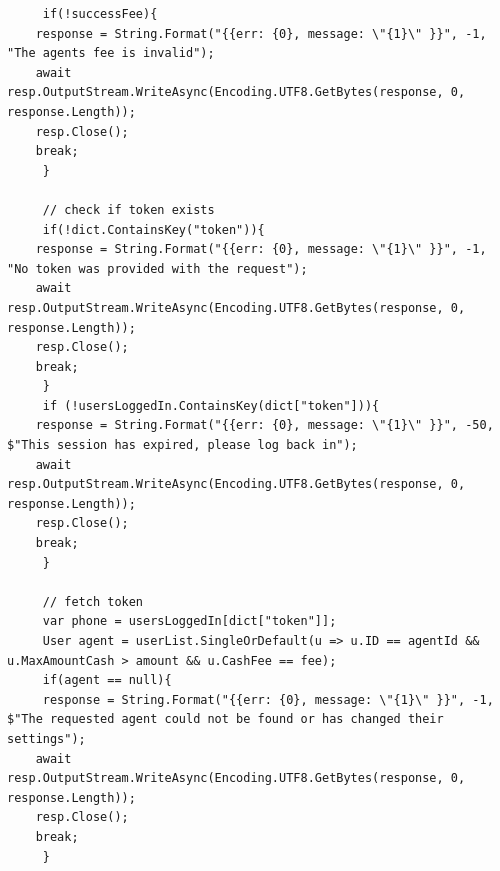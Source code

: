 \documentclass[11pt, a4paper]{article}
\begin{document}
\begin{appendices}
\begin{lstlisting}
     if(!successFee){
    response = String.Format("{{err: {0}, message: \"{1}\" }}", -1, "The agents fee is invalid");
    await resp.OutputStream.WriteAsync(Encoding.UTF8.GetBytes(response, 0, response.Length));
    resp.Close();
    break;
     }

     // check if token exists
     if(!dict.ContainsKey("token")){
    response = String.Format("{{err: {0}, message: \"{1}\" }}", -1, "No token was provided with the request");
    await resp.OutputStream.WriteAsync(Encoding.UTF8.GetBytes(response, 0, response.Length));
    resp.Close();
    break;
     }
     if (!usersLoggedIn.ContainsKey(dict["token"])){
    response = String.Format("{{err: {0}, message: \"{1}\" }}", -50, $"This session has expired, please log back in");
    await resp.OutputStream.WriteAsync(Encoding.UTF8.GetBytes(response, 0, response.Length));
    resp.Close();
    break;
     }

     // fetch token
     var phone = usersLoggedIn[dict["token"]];
     User agent = userList.SingleOrDefault(u => u.ID == agentId && u.MaxAmountCash > amount && u.CashFee == fee);
     if(agent == null){
     response = String.Format("{{err: {0}, message: \"{1}\" }}", -1, $"The requested agent could not be found or has changed their settings");
    await resp.OutputStream.WriteAsync(Encoding.UTF8.GetBytes(response, 0, response.Length));
    resp.Close();
    break;
     }


\end{lstlisting}
\end{appendices}
\end{document}
